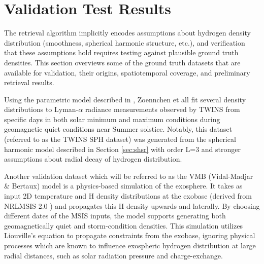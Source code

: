\documentclass[pdflatex,twocolumn,sn-mathphys-num]{sn-jnl}
\begin{document}


\section{Validation Test Results}



The retrieval algorithm implicitly encodes assumptions about hydrogen density distribution (smoothness, spherical harmonic structure, etc.), and verification that these assumptions hold requires testing against plausible ground truth densities.  This section overviews some of the ground truth datasets that are available for validation, their origins, spatiotemporal coverage, and preliminary retrieval results.

    Using the parametric model described in \cite{zoennchen_new}, Zoennchen et all fit several density distributions to Lyman-$\alpha$ radiance measurements observed by TWINS from specific days in both solar minimum and maximum conditions during geomagnetic quiet conditions near Summer solstice.
    Notably, this dataset (referred to as the TWINS SPH dataset) was generated from the spherical harmonic model described in Section \ref{sec:shsr} with order L=3 and stronger assumptions about radial decay of hydrogen distribution.

  Another validation dataset which will be referred to as the VMB (Vidal-Madjar \& Bertaux) model \cite{vmb} is a physics-based simulation of the exosphere.  It takes as input 2D temperature and H density distributions at the exobase (derived from NRLMSIS 2.0 \cite{msis}) and propagates this H density upwards and laterally.  By choosing different dates of the MSIS inputs, the model supports generating both geomagnetically quiet and storm-condition densities.  This simulation utilizes Liouville's equation to propagate constraints from the exobase, ignoring physical processes which are known to influence exospheric hydrogen distribution at large radial distances, such as solar radiation pressure and charge-exchange.
\end{document}
